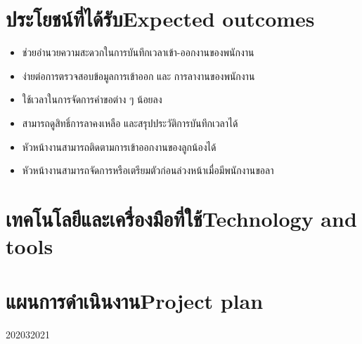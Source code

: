 \section{\ifcpe ประโยชน์ที่ได้รับ\else Expected outcomes\fi}
\begin{itemize}
    \item ช่วยอำนวยความสะดวกในการบันทึกเวลาเข้า-ออกงานของพนักงาน
    \item ง่ายต่อการตรวจสอบข้อมูลการเข้าออก และ การลางานของพนักงาน
    \item ใช้เวลาในการจัดการคำขอต่าง ๆ น้อยลง
    \item สามารถดูสิทธิ์การลาคงเหลือ และสรุปประวัติการบันทึกเวลาได้
    \item หัวหน้างานสามารถติดตามการเข้าออกงานของลูกน้องได้
    \item หัวหน้างานสามารถจัดการหรือเตรียมตัวก่อนล่วงหน้าเมื่อมีพนักงานขอลา
\end{itemize}
\section{\ifcpe เทคโนโลยีและเครื่องมือที่ใช้\else Technology and tools\fi}
\section{\ifcpe แผนการดำเนินงาน\else Project plan\fi}
\begin{plan}{7}{2020}{3}{2021}
\end{plan}

